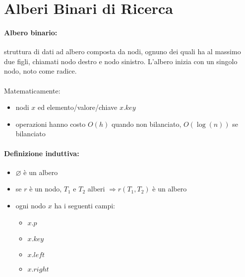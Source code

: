 \section{Alberi Binari di Ricerca}
\paragraph{Albero binario:} struttura di dati ad albero composta da nodi, ognuno dei quali ha al massimo due figli, chiamati nodo destro e nodo sinistro. L'albero inizia con un singolo nodo, noto come radice. \\~\\

Matematicamente:
\begin{itemize}
    \item nodi $x$ ed elemento/valore/chiave $x.key$
    \item operazioni hanno costo $O(h)$ quando non bilanciato, $O(\log(n))$ se bilanciato
\end{itemize}

\paragraph{Definizione induttiva:}
\begin{itemize}
    \item $\varnothing$ è un albero
    \item se $r$ è un nodo, $T_1$ e $T_2$ alberi $\Rightarrow r(T_1,T_2)$ è un albero
    \item ogni nodo $x$ ha i seguenti campi:
    \begin{itemize}
        \item $x.p$
        \item $x.key$
        \item $x.left$
        \item $x.right$
    \end{itemize}
\end{itemize}
